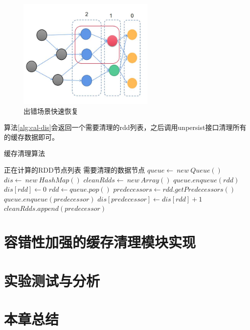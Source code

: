 \begin{figure}[htbp]
    \centering
    \includegraphics[width=0.6\textwidth]{Img/ft2.png}
    \caption{出错场景快速恢复}
    \label{fig:ft2}
\end{figure}

算法\ref{alg:cal-dis}会返回一个需要清理的rdd列表，之后调用unpersist接口清理所有的缓存数据即可。

\begin{algorithm}  
    \caption{缓存清理算法}  
    \begin{algorithmic}[1] %
        \Require 正在计算的RDD节点列表
        \Ensure 需要清理的数据节点
            \State $queue \gets \ new \ Queue()$
            \State $dis \gets  \ new \ HashMap()$
            \State $cleanRdds \gets \ new \ Array()$
                \State $queue.enqueue(rdd)$
                \State $dis[rdd] \gets 0$
            \EndFor
                \State $rdd \gets queue.pop()$
                \State $predecessors \gets rdd.getPredecessors()$
                    \State $queue.enqueue(predecessor)$
                    \State $dis[predecessor] \gets dis[rdd]+1$
                        $cleanRdds.append(predecessor)$
                    \EndIf
                \EndFor
            \EndWhile
        \EndFunction
    \end{algorithmic}
    \label{alg:cal-dis}
\end{algorithm}

\section{容错性加强的缓存清理模块实现}




\section{实验测试与分析}
\section{本章总结}
